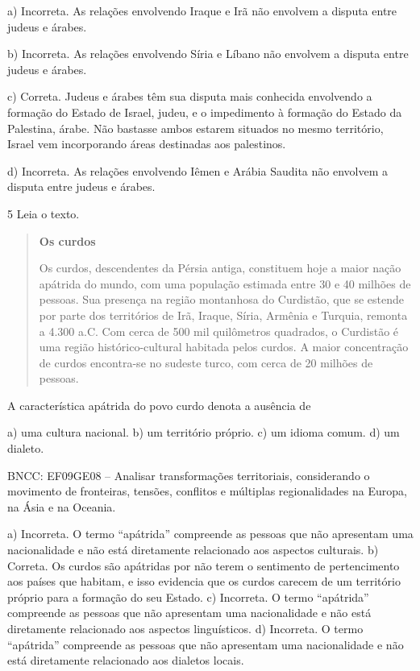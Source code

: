 a) Incorreta. As relações envolvendo Iraque e Irã não envolvem a
disputa entre judeus e árabes.

b) Incorreta. As relações envolvendo Síria e Líbano não envolvem a
disputa entre judeus e árabes.

c) Correta. Judeus e árabes têm sua disputa mais conhecida envolvendo
a formação do Estado de Israel, judeu, e o impedimento à formação do
Estado da Palestina, árabe. Não bastasse ambos estarem situados no mesmo
território, Israel vem incorporando áreas destinadas aos
palestinos.

d) Incorreta. As relações envolvendo Iêmen e Arábia Saudita não
envolvem a disputa entre judeus e árabes.


\num{5} Leia o texto.

\begin{quote}
\textbf{Os curdos}

Os curdos, descendentes da Pérsia antiga, constituem hoje a maior nação apátrida do mundo, com uma população estimada entre 30 e 40 milhões de pessoas. Sua presença na região montanhosa do Curdistão, que se estende por parte dos territórios de Irã, Iraque, Síria, Armênia e Turquia, remonta a 4.300 a.C. Com cerca de 500 mil quilômetros quadrados, o Curdistão é uma região histórico-cultural habitada pelos curdos. A maior concentração de curdos encontra-se no sudeste turco, com cerca de 20 milhões de pessoas.

\end{quote}

A característica apátrida do povo curdo denota a ausência de

a)  uma cultura nacional.
b)  um território próprio.
c)  um idioma comum.
d)  um dialeto.

BNCC: EF09GE08 -- Analisar transformações territoriais, considerando o
movimento de fronteiras, tensões, conflitos e múltiplas regionalidades
na Europa, na Ásia e na Oceania.

a)  Incorreta. O termo ``apátrida'' compreende as pessoas que não apresentam uma nacionalidade e não está diretamente relacionado aos aspectos culturais.
b)  Correta. Os curdos são apátridas por não terem o sentimento de pertencimento aos países que habitam, e isso evidencia que os curdos carecem de um território próprio para a formação do seu Estado.
c)  Incorreta. O termo ``apátrida'' compreende as pessoas que não apresentam uma nacionalidade e não está diretamente relacionado aos aspectos linguísticos.
d)  Incorreta. O termo ``apátrida'' compreende as pessoas que não apresentam uma nacionalidade e não está diretamente relacionado aos dialetos locais.


